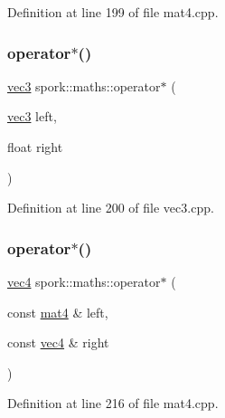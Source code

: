 Definition at line 199 of file mat4.\+cpp.

\mbox{\label{namespacespork_1_1maths_ac73b9375d78ee867fb4924d57771c6e1}} 
\subsubsection{\texorpdfstring{operator$\ast$()}{operator*()}\hspace{0.1cm}{\footnotesize\ttfamily [7/8]}}
{\footnotesize\ttfamily \hyperlink{structspork_1_1maths_1_1vec3}{vec3} spork\+::maths\+::operator$\ast$ (\begin{DoxyParamCaption}\item[{\hyperlink{structspork_1_1maths_1_1vec3}{vec3}}]{left,  }\item[{float}]{right }\end{DoxyParamCaption})}



Definition at line 200 of file vec3.\+cpp.

\mbox{\label{namespacespork_1_1maths_ad74bbcba8e01344bc4d987b7ea41b001}} 
\subsubsection{\texorpdfstring{operator$\ast$()}{operator*()}\hspace{0.1cm}{\footnotesize\ttfamily [8/8]}}
{\footnotesize\ttfamily \hyperlink{structspork_1_1maths_1_1vec4}{vec4} spork\+::maths\+::operator$\ast$ (\begin{DoxyParamCaption}\item[{const \hyperlink{structspork_1_1maths_1_1mat4}{mat4} \&}]{left,  }\item[{const \hyperlink{structspork_1_1maths_1_1vec4}{vec4} \&}]{right }\end{DoxyParamCaption})}



Definition at line 216 of file mat4.\+cpp.

\mbox{\label{namespacespork_1_1maths_aa0b8eecee8b72ea828601a9dc89fe6f7}} 
